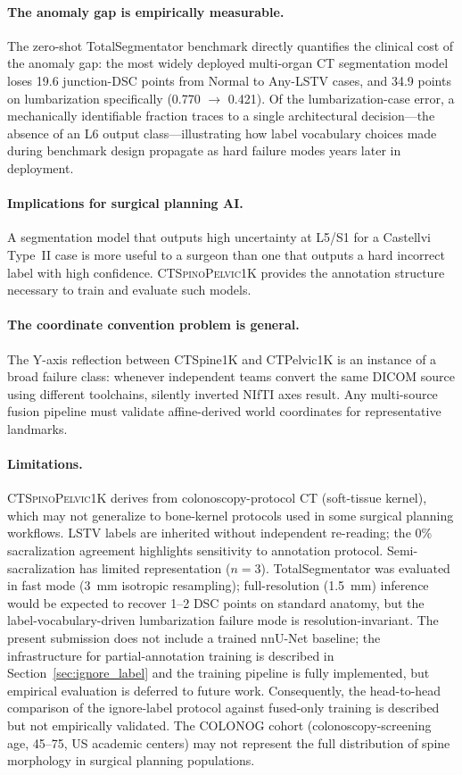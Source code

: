 \documentclass[pmlr]{jmlr}
\newcommand{\dataset}{\textsc{CTSpinoPelvic1K}}
\begin{document}
\paragraph{The anomaly gap is empirically measurable.}
The zero-shot TotalSegmentator benchmark directly quantifies the
clinical cost of the anomaly gap: the most widely deployed
multi-organ CT segmentation model loses 19.6 junction-DSC points
from Normal to Any-LSTV cases, and 34.9 points on lumbarization
specifically (0.770 $\rightarrow$ 0.421).
Of the lumbarization-case error, a mechanically identifiable
fraction traces to a single architectural decision---the absence of
an L6 output class---illustrating how label vocabulary choices made
during benchmark design propagate as hard failure modes years
later in deployment.

\paragraph{Implications for surgical planning AI.}
A segmentation model that outputs high uncertainty at L5/S1 for a
Castellvi Type~II case is more useful to a surgeon than one that
outputs a hard incorrect label with high confidence.
\dataset{} provides the annotation structure necessary to train
and evaluate such models.

\paragraph{The coordinate convention problem is general.}
The Y-axis reflection between CTSpine1K and CTPelvic1K is an
instance of a broad failure class: whenever independent teams
convert the same DICOM source using different toolchains, silently
inverted NIfTI axes result.
Any multi-source fusion pipeline must validate affine-derived world
coordinates for representative landmarks.

\paragraph{Limitations.}
\dataset{} derives from colonoscopy-protocol CT (soft-tissue kernel),
which may not generalize to bone-kernel protocols used in some
surgical planning workflows.
LSTV labels are inherited without independent re-reading; the 0\%
sacralization agreement highlights sensitivity to annotation protocol.
Semi-sacralization has limited representation ($n=3$).
TotalSegmentator was evaluated in fast mode (3~mm isotropic
resampling); full-resolution (1.5~mm) inference would be expected
to recover 1--2 DSC points on standard anatomy, but the
label-vocabulary-driven lumbarization failure mode is
resolution-invariant.
The present submission does not include a trained nnU-Net baseline;
the infrastructure for partial-annotation training is described in
Section~\ref{sec:ignore_label} and the training pipeline is fully
implemented, but empirical evaluation is deferred to future work.
Consequently, the head-to-head comparison of the ignore-label
protocol against fused-only training is described but not
empirically validated.
The COLONOG cohort (colonoscopy-screening age, 45--75, US academic
centers) may not represent the full distribution of spine morphology
in surgical planning populations.
\end{document}
